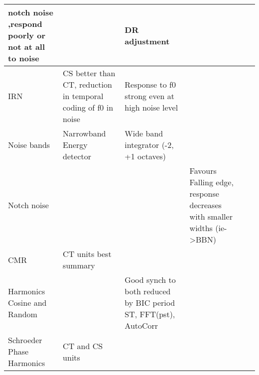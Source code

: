 \begin{longtable}{XXXXXX}
\citep{SpirouDavisEtAl:1999}notch noise \citep{ReissYoung:2005} ,respond
           poorly or not at all to noise \citep{Rhode:1999}             &                                                                          & DR adjustment
\citep{GibsonYoungEtAl:1985}\\\hline
                                  IRN                                   & CS better than CT, reduction in
temporal coding of f0 in noise
\citep{WiegrebeKrumbholz:1999,WiegrebeWinter:2001,WinterPalmerEtAl:2003;WinterWiegrebeEtAl:2001}
                                                                        & Response to f0 strong even at high noise level
                     \citep{WinterPalmerEtAl:2003}                      &                                                                          & & \\\hline
                              Noise bands                               & Narrowband Energy
                 detector \citep{PalmerJiangEtAl:1996}                  & Wide band integrator (-2, +1
                 octaves) \citep{PalmerJiangEtAl:1996}                  &                                                                          & & \\\hline
                              Notch noise                               &                                                                          & & 
Favours Falling edge, response decreases with smaller widths
    (ie-{\textgreater}BBN) \citep{NelkenYoung:1994,ReissYoung:2005}     &                                                                          & \\\hline
                                  CMR                                   & CT units best \citep{PressnitzerMeddisEtAl:2001} summary
                  \citep{VerheyPressnitzerEtAl:2003}                    &                                                                          & & & \\\hline
Harmonics Cosine and
                                Random                                  &                                                                          & Good synch to both reduced by BIC\citep{EvansZhao:1998}
        \citep{PalmerWinter:1993} period ST, FFT(pst), AutoCorr         &                                                                          & & 

\\\hline
                       Schroeder Phase Harmonics                        &                    CT and CS units \citep{Recio:2001}                    & & 
                                                                        &                                                                          & 


\end{longtable}
